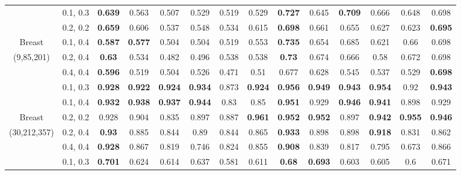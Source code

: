 \begin{table}[ht]
\begin{tabular}{|c|c|c|c|c|c|c|c|c|c|c|c|c|c|}
               & 0.1, 0.3   & \textbf{0.639} & 0.563     & 0.507     & 0.529 & 0.519 & 0.529 
               & \textbf{0.727} & 0.645     & \textbf{0.709}     & 0.666 & 0.648 & 0.698 \\ 
               & 0.2, 0.2   & \textbf{0.659} & 0.606     & 0.537     & 0.548 & 0.534 & 0.615 
               & \textbf{0.698} & 0.661     & 0.655     & 0.627 & 0.623 & \textbf{0.695} \\
Breast         & 0.1, 0.4   & \textbf{0.587} & \textbf{0.577}     & 0.504     & 0.504 & 0.519 & 0.553 
               & \textbf{0.735} & 0.654     & 0.685     & 0.621 & 0.66  & 0.698 \\
(9,85,201)     & 0.2, 0.4   & \textbf{0.63}  & 0.534     & 0.482     & 0.496 & 0.538 & 0.538 
               & \textbf{0.73}  & 0.674     & 0.666     & 0.58  & 0.672 & 0.698 \\
               & 0.4, 0.4   & \textbf{0.596} & 0.519     & 0.504     & 0.526 & 0.471 & 0.51  
               & 0.677 & 0.628     & 0.545     & 0.537 & 0.529 & \textbf{0.698} \\ \hline
               & 0.1, 0.3   & \textbf{0.928} & \textbf{0.922}     & \textbf{0.924}     & \textbf{0.934} & 0.873 & \textbf{0.924} 
               & \textbf{0.956} & \textbf{0.949}     & \textbf{0.943}     & \textbf{0.954} & 0.92  & \textbf{0.943} \\ 
               & 0.1, 0.4   & \textbf{0.932} & \textbf{0.938}     & \textbf{0.937}     & \textbf{0.944} & 0.83  & 0.85  
               & \textbf{0.951} & 0.929     & \textbf{0.946}     & \textbf{0.941} & 0.898 & 0.929 \\
Breast         & 0.2, 0.2   & 0.928 & 0.904     & 0.835     & 0.897 & 0.887 & \textbf{0.961} 
               & \textbf{0.952} & \textbf{0.952}     & 0.897     & \textbf{0.942} & \textbf{0.955} & \textbf{0.946} \\
(30,212,357)   & 0.2, 0.4   & \textbf{0.93}  & 0.885     & 0.844     & 0.89  & 0.844 & 0.865 
               & \textbf{0.933} & 0.898     & 0.898     & \textbf{0.918} & 0.831 & 0.862 \\
               & 0.4, 0.4   & \textbf{0.928} & 0.867     & 0.819     & 0.746 & 0.824 & 0.855 
               & \textbf{0.908} & 0.839     & 0.817     & 0.795 & 0.673 & 0.866 \\ \hline
               & 0.1, 0.3   & \textbf{0.701} & 0.624     & 0.614     & 0.637 & 0.581 & 0.611 
               & \textbf{0.68}  & \textbf{0.693}     & 0.603     & 0.605 & 0.6   & 0.671 \\ 

\end{tabular}
\end{table}
